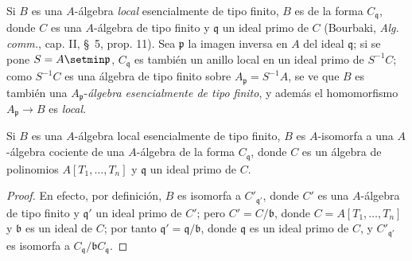 
\begin{env}[1.3.10]
\label{IV.1.3.10-fr}
Si $B$ es una $A$-álgebra \emph{local} esencialmente de tipo finito, $B$ es
de la forma $C_{\mathfrak q}$, donde $C$ es una $A$-álgebra de tipo finito y
$\mathfrak q$ un ideal primo de $C$ (Bourbaki, \emph{Alg. comm.}, cap. II,
\S~5, prop. 11). Sea $\mathfrak p$ la imagen inversa en $A$ del ideal
$\mathfrak q$; si se pone $S=A\setmin\mathfrak p$, $C_{\mathfrak q}$ es también un
anillo local en un ideal primo de $S^{-1}C$; como $S^{-1}C$ es una
álgebra de tipo finito sobre $A_{\mathfrak p}=S^{-1}A$, se ve que $B$ es también
una $A_{\mathfrak p}$-\emph{álgebra esencialmente de tipo finito}, y además
el homomorfismo $A_{\mathfrak p}\to B$ es \emph{local}.
\end{env}

\begin{proposition}[1.3.11]
\label{IV.1.3.11-fr}
Si $B$ es una $A$-álgebra local esencialmente de tipo finito, $B$ es
$A$-isomorfa a una $A$-álgebra cociente de una $A$-álgebra de la forma
$C_{\mathfrak q}$, donde $C$ es un álgebra de polinomios
$A[T_1,\ldots,T_n]$ y $\mathfrak q$ un ideal primo de $C$.
\end{proposition}

\begin{proof}
En efecto, por definición, $B$ es isomorfa a $C'_{\mathfrak q'}$, donde $C'$ es
una $A$-álgebra de tipo finito y $\mathfrak q'$ un ideal primo de $C'$; pero
$C'=C/\mathfrak b$, donde $C=A[T_1,\ldots,T_n]$ y $\mathfrak b$ es un ideal de
$C$; por tanto $\mathfrak q'=\mathfrak q/\mathfrak b$, donde $\mathfrak q$ es un
ideal primo de $C$, y $C'_{\mathfrak q'}$ es isomorfa a
$C_{\mathfrak q}/\mathfrak bC_{\mathfrak q}$.
\end{proof}


